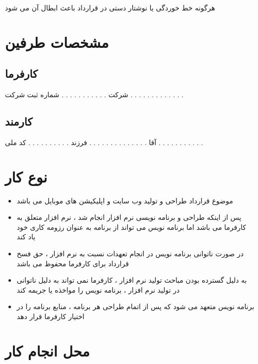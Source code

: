 \documentclass[12pt]{article}
\begin{document}
\begin{tcolorbox}[
title=تبصره 1
]
هرگونه خط خوردگی یا نوشتار دستی در قرارداد باعث ابطال آن می شود 
\end{tcolorbox}




\section{مشخصات طرفین}


\subsection{کارفرما}


شرکت  . . . . . . . . . . .  شماره ثبت شرکت . . . . . . . . . . . . .

\subsection{کارمند}


آقا . . . . . . . . . . . . . . فرزند . . . . . . . . . .  کد ملی . . . . . . . . . . .



\section{نوع کار}


\begin{itemize}
	\item موضوع قرارداد طراحی و تولید وب سایت و اپلیکیشن های موبایل می باشد
	\item  پس از اینکه طراحی و برنامه نویسی نرم افزار انجام شد ، 
	نرم افزار متعلق به کارفرما می باشد اما برنامه نویس می تواند از برنامه به عنوان رزومه کاری خود یاد کند
	\item در صورت ناتوانی برنامه نویس در انجام تعهدات نسبت به نرم افزار ، حق فسخ قرارداد برای کارفرما محفوظ می باشد
	\item به دلیل گسترده بودن مباحث تولید نرم افزار ، 
	کارفرما نمی تواند به دلیل ناتوانی در تولید نرم افزار ، برنامه نویس را مواخذه یا جریمه کند
	\item برنامه نویس متعهد می شود که پس از اتمام طراحی هر برنامه   ، منابع برنامه را در اختیار کارفرما قرار دهد
\end{itemize}



\section{محل انجام کار}
\end{document}
